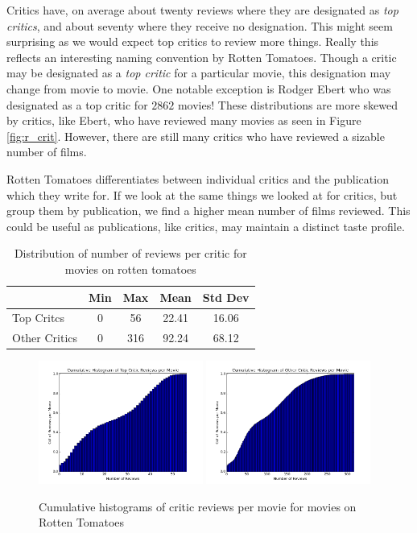 \documentclass[12pt]{article}
\begin{document}
	Critics have, on average about twenty reviews where they are designated as \textit{top critics}, and about seventy where they receive no designation. This might seem surprising as we would expect top critics to review more things. Really this reflects an interesting naming convention by Rotten Tomatoes. Though a critic may be designated as a \textit{top critic} for a particular movie, this designation may change from movie to movie. One notable exception is Rodger Ebert who was designated as a top critic for $2862$ movies! These distributions are more skewed by critics, like Ebert, who have reviewed many movies as seen in Figure \ref{fig:r_crit}. However, there are still many critics who have reviewed a sizable number of films.

	Rotten Tomatoes differentiates between individual critics and the publication which they write for. If we look at the same things we looked at for critics, but group them by publication, we find a higher mean number of films reviewed. This could be useful as publications, like critics, may maintain a distinct taste profile.

	\begin{table}[H]
	 \centering
	 \caption{Distribution of number of reviews per critic for movies on rotten tomatoes}
	 \begin{tabular}{ l | c | c | c | c }
	 \hline
	 &  Min & Max & Mean & Std Dev  \\
	 \hline
	 Top Critcs & 0 & 56 & 22.41 & 16.06 \\
	 Other Critics & 0 & 316 & 92.24 & 68.12 \\
	 \hline
	 \end{tabular}
	 \end{table}

	\begin{figure}[H]
	    \centering
	    \includegraphics[width=0.48\textwidth]{plots/plot_r_mov_top.png}
	    \includegraphics[width=0.48\textwidth]{plots/plot_r_mov_oth.png}
	    \caption{Cumulative histograms of critic reviews per movie for movies on Rotten Tomatoes}
	    \label{fig:r_mov} 
	\end{figure}
\end{document}
